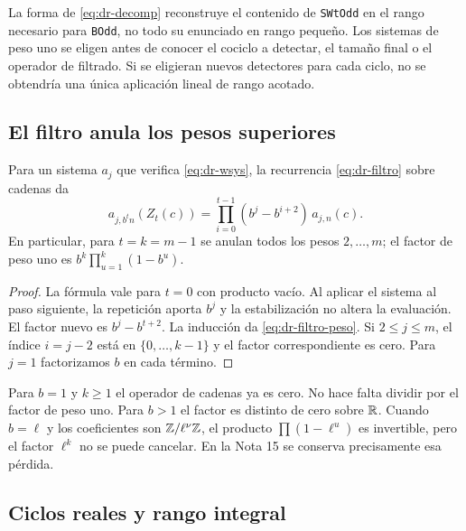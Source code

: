 La forma de \eqref{eq:dr-decomp} reconstruye el contenido de \texttt{SWtOdd} en el rango necesario para \texttt{BOdd}, no todo su enunciado en rango pequeño. Los sistemas de peso uno se eligen antes de conocer el cociclo a detectar, el tamaño final o el operador de filtrado. Si se eligieran nuevos detectores para cada ciclo, no se obtendría una única aplicación lineal de rango acotado.

\subsection{El filtro anula los pesos superiores}

\begin{lema}
\label{lem:dr-filtro}
Para un sistema $a_j$ que verifica \eqref{eq:dr-wsys}, la recurrencia \eqref{eq:dr-filtro} sobre cadenas da
\begin{equation}
 a_{j,b^tn}(Z_t(c))=\prod_{i=0}^{t-1}(b^j-b^{i+2})\,a_{j,n}(c).
 \label{eq:dr-filtro-peso}
\end{equation}
En particular, para $t=k=m-1$ se anulan todos los pesos $2,\ldots,m$; el factor de peso uno es $b^k\prod_{u=1}^k(1-b^u)$.
\end{lema}
\begin{proof}
La fórmula vale para $t=0$ con producto vacío. Al aplicar el sistema al paso siguiente, la repetición aporta $b^j$ y la estabilización no altera la evaluación. El factor nuevo es $b^j-b^{t+2}$. La inducción da \eqref{eq:dr-filtro-peso}. Si $2\le j\le m$, el índice $i=j-2$ está en $\{0,\ldots,k-1\}$ y el factor correspondiente es cero. Para $j=1$ factorizamos $b$ en cada término.
\end{proof}

Para $b=1$ y $k\ge1$ el operador de cadenas ya es cero. No hace falta dividir por el factor de peso uno. Para $b>1$ el factor es distinto de cero sobre $\mathbb{R}$. Cuando $b=\ell$ y los coeficientes son $\mathbb{Z}/\ell^\nu\mathbb{Z}$, el producto $\prod(1-\ell^u)$ es invertible, pero el factor $\ell^k$ no se puede cancelar. En la Nota 15 se conserva precisamente esa pérdida.

\subsection{Ciclos reales y rango integral}

